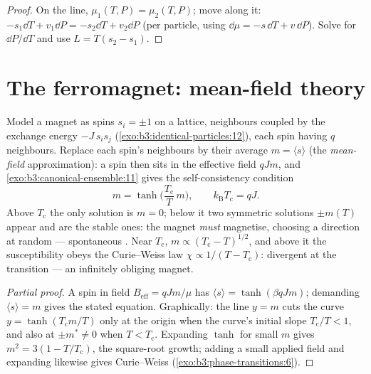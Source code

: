 \begin{proof}
On the line, $\mu_1(T, P) = \mu_2(T, P)$; move along it:
$-s_1\dd T + v_1\dd P = -s_2\dd T + v_2\dd P$ (per particle, using
$\dd\mu = -s\,\dd T + v\,\dd P$). Solve for $\dd P/\dd T$ and use
$L = T(s_2 - s_1)$.
\end{proof}

\section{The ferromagnet: mean-field theory}

\begin{theorem}\label{thm:b3:phase-transitions:meanfield}
Model a magnet as spins $s_i = \pm1$ on a lattice, neighbours
coupled by the exchange energy $-J\,s_is_j$
(\cref{exo:b3:identical-particles:12}), each spin having $q$
neighbours. Replace each spin's neighbours by their average $m =
\langle s\rangle$ (the \emph{mean-field} approximation): a spin
then sits in the effective field $qJm$, and
\cref{exo:b3:canonical-ensemble:11} gives the self-consistency
condition
\[
m = \tanh\!\Big(\frac{T_{\text{c}}}{T}\,m\Big) , \qquad
k_{\text{B}}T_{\text{c}} = qJ .
\]
Above $T_{\text{c}}$ the only solution is $m = 0$; below it two
symmetric solutions $\pm m(T)$ appear and are the stable ones: the
magnet \emph{must} magnetise, choosing a direction at random ---
spontaneous . Near $T_{\text{c}}$, $m \propto
(T_{\text{c}} - T)^{1/2}$, and above it the susceptibility obeys
the Curie--Weiss law $\chi \propto 1/(T - T_{\text{c}})$:
divergent at the transition --- an infinitely obliging magnet.
\end{theorem}

\begin{proof}[Partial proof]
A spin in field $B_{\text{eff}} = qJm/\mu$ has $\langle s\rangle =
\tanh(\beta qJm)$; demanding $\langle s\rangle = m$ gives the
stated equation. Graphically: the line $y = m$ cuts the curve $y =
\tanh(T_{\text{c}}m/T)$ only at the origin when the curve's initial
slope $T_{\text{c}}/T < 1$, and also at $\pm m^* \neq 0$ when
$T < T_{\text{c}}$. Expanding $\tanh$ for small
$m$ gives $m^2 = 3(1 - T/T_{\text{c}})$, the square-root growth;
adding a small applied field and expanding likewise gives
Curie--Weiss (\cref{exo:b3:phase-transitions:6}).
\end{proof}

